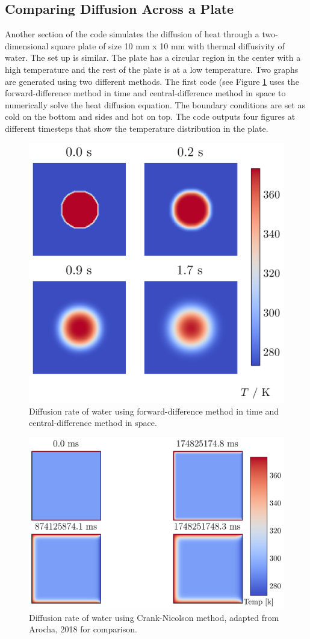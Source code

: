 \subsection{Comparing Diffusion Across a Plate }
Another section of the code simulates the diffusion of heat through a two-dimensional square plate of size 10 mm x 10 mm with thermal diffusivity of water. The set up is similar. The plate has a circular region in the center with a high temperature and the rest of the plate is at a low temperature. Two graphs are generated using two different methods. The first code (see Figure \ref{fig:cdm} uses the forward-difference method in time and central-difference method in space to numerically solve the heat diffusion equation. The boundary conditions are set as cold on the bottom and sides and hot on top. The code outputs four figures at different timesteps that show the temperature distribution in the plate. 

\begin{figure}[htb!]
\begin{center}
\includegraphics[width=.49\textwidth]{images/th_water.png}
\vspace*{-8mm}
\caption{Diffusion rate of water using forward-difference method in time and central-difference method in space.}
\label{fig:cdm}
\end{center}
\end{figure}

\begin{figure}[htb!]
\begin{center}
\includegraphics[width=.49\textwidth]{images/th_water_2.png}
\vspace*{-8mm}
\caption{Diffusion rate of water using Crank-Nicolson method, adapted from Arocha, 2018 \cite{Arocha2018} for comparison.}
\label{fig:cnm}
\end{center}
\end{figure}

